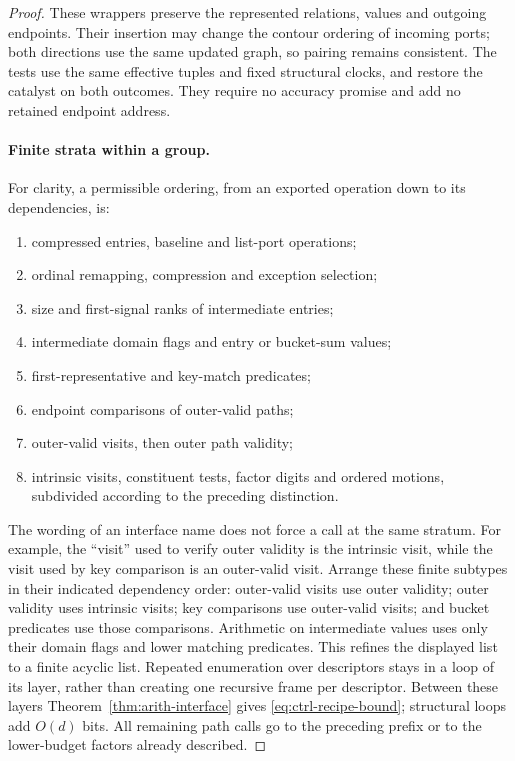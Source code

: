 \begin{proof}
These wrappers preserve the represented relations, values and outgoing
endpoints. Their insertion may change the contour ordering of incoming
ports; both directions use the same updated graph, so pairing remains
consistent. The tests use the same effective tuples and fixed structural
clocks, and restore the catalyst on both outcomes. They require no
accuracy promise and add no retained endpoint address.

\paragraph{Finite strata within a group.}
For clarity, a permissible ordering, from an exported operation down
to its dependencies, is:
\begin{enumerate}
\item compressed entries, baseline and list-port operations;
\item ordinal remapping, compression and exception selection;
\item size and first-signal ranks of intermediate entries;
\item intermediate domain flags and entry or bucket-sum values;
\item first-representative and key-match predicates;
\item endpoint comparisons of outer-valid paths;
\item outer-valid visits, then outer path validity;
\item intrinsic visits, constituent tests, factor digits and ordered
  motions, subdivided according to the preceding distinction.
\end{enumerate}
The wording of an interface name does not force a call at the same
stratum.  For example, the ``visit'' used to verify outer validity is
the intrinsic visit, while the visit used by key comparison is an
outer-valid visit.  Arrange these finite subtypes in their indicated
dependency order: outer-valid visits use outer validity; outer validity
uses intrinsic visits; key comparisons use outer-valid visits; and
bucket predicates use those comparisons.  Arithmetic on intermediate
values uses only their domain flags and lower matching predicates.
This refines the displayed list to a finite acyclic list.  Repeated
enumeration over descriptors stays in a loop of its layer, rather than
creating one recursive frame per descriptor.  Between these layers
Theorem~\ref{thm:arith-interface} gives \eqref{eq:ctrl-recipe-bound};
structural loops add $O(d)$ bits.  All remaining path calls go to the
preceding prefix or to the lower-budget factors already described.


\end{proof}

